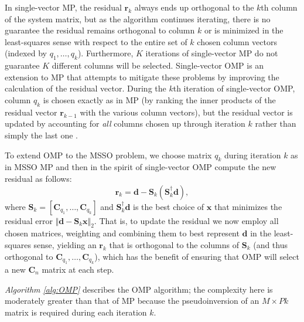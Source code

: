 \documentclass[final]{siamltex}
\newcommand{\la}[1]{\mbox{$\mathbf{#1}$}}  \newcommand{\sst}[1]{\mbox{\scriptsize{#1}}}
\begin{document}
    In single-vector MP, the residual $\la{r}_k$ always ends up
    orthogonal to the $k$th column of the system matrix, but as the
    algorithm continues iterating, there is no guarantee the residual
    remains orthogonal to column $k$ or is minimized in the
    least-squares sense with respect to the entire set of $k$ chosen
    column vectors (indexed by $q_1, \ldots, q_k$).  Furthermore, $K$
    iterations of single-vector MP do not guarantee $K$ different
    columns will be selected.  Single-vector OMP is an extension to MP
    that attempts to mitigate these problems by improving the
    calculation of the residual vector.  During the $k$th iteration of
    single-vector OMP, column $q_k$ is chosen exactly as in MP (by
    ranking the inner products of the residual vector $\la{r}_{k-1}$
    with the various column vectors), but the residual vector is
    updated by accounting for {\em{all}} columns chosen up through
    iteration $k$ rather than simply the last one \cite{Nat1995,
    Cot1999}.

    To extend OMP to the MSSO problem, we choose matrix $q_k$ during
    iteration $k$ as in MSSO MP and then in the spirit of
    single-vector OMP compute the new residual as follows:
    \begin{equation}\label{omp1} 
      \la{r}_k = \la{d} - \la{S}_{k} ( \la{S}_{k}^{\dagger} \la{d} ),
    \end{equation} 
    where $\la{S}_k = \left [ \la{C}_{q_1}, \ldots, \la{C}_{q_k}
    \right ]$ and $\la{S}_{k}^{\dagger} \la{d}$ is the best choice of
    \la{x} that minimizes the residual error $\Vert \la{d} - \la{S}_k
    \la{x} \Vert_2$.  That is, to update the residual we now employ
    all chosen matrices, weighting and combining them to best
    represent \la{d} in the least-squares sense, yielding an
    $\la{r}_k$ that is orthogonal to the columns of $\la{S}_k$ (and
    thus orthogonal to $\la{C}_{q_1}, \ldots, \la{C}_{q_k}$), which
    has the benefit of ensuring that OMP will select a new $\la{C}_n$
    matrix at each step.

    {\em{Algorithm \ref{alg:OMP}}} describes the OMP algorithm; the
    complexity here is moderately greater than that of MP because the
    pseudoinversion of an $M \times Pk$ matrix is required during each
    iteration $k$.
\end{document}
